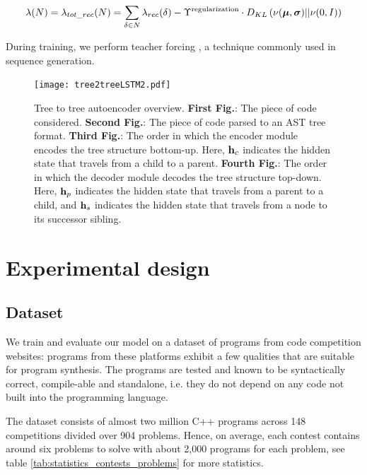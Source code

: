 \begin{align}
    \lambda(N) = \lambda_{tot\_rec}(N) = \sum_{\delta \in N}\lambda_{rec}(\delta) - \Upsilon^\text{regularization} \cdot D_{KL}\left(\nu(\boldsymbol\mu,\boldsymbol\sigma)||\nu(0,I)\right)
\end{align}

During training, we perform teacher forcing \cite[section 11.6.6]{kolenFieldGuideDynamical2001}, a technique commonly used in sequence generation.

\begin{figure}
    \centering
    \texttt{[image: tree2treeLSTM2.pdf]}
    \caption[Tree2Tree model high-level overview]{Tree to tree autoencoder overview. \textbf{First Fig.}: The piece of code considered. \textbf{Second Fig.}: The piece of code parsed to an AST tree format. \textbf{Third Fig.}: The order in which the encoder module encodes the tree structure bottom-up. Here, $\mathbf{h}_c$ indicates the hidden state that travels from a child to a parent. \textbf{Fourth Fig.}: The order in which the decoder module decodes the tree structure top-down. Here, $\mathbf{h}_p$ indicates the hidden state that travels from a parent to a child, and $\mathbf{h}_s$ indicates the hidden state that travels from a node to its successor sibling.}
    \label{fig:tree2treeVAE}
\end{figure}

\newpage
\section{Experimental design}
\label{sec:tree2tree-eval}

\subsection{Dataset}
\label{sec:tree2tree-dataset}
We train and evaluate our model on a dataset of programs from code competition websites: programs from these platforms exhibit a few qualities that are suitable for program synthesis. The programs are tested and known to be syntactically correct, compile-able and standalone, i.e. they do not depend on any code not built into the programming language. 

The dataset consists of almost two million C++ programs across 148 competitions divided over 904 problems. 
Hence, on average, each contest contains around six problems to solve with about 2,000 programs for each problem, see table \ref{tab:statistics_contests_problems} for more statistics. 

